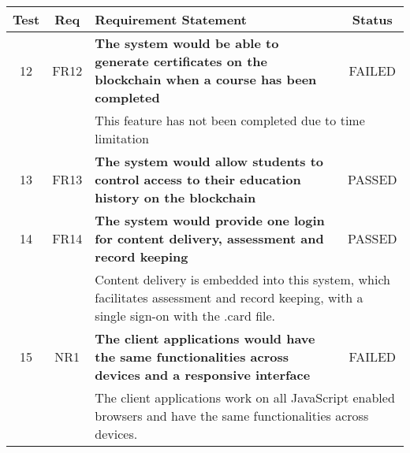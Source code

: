 \begin{table}[!ht]
    \begin{tabularx}{\textwidth}{|c|c|X|c|}
        \hline
		Test                                                              & Req                     & Requirement Statement                                                                                                                                 & Status                  \\
        \hline
        12                                                                & FR12                    & \textbf{The system would be able to generate certificates on
		the blockchain when a course has been completed}                  & \cellcolor{pink}FAILED                                                                                                                                                                                    \\
        \hline
        &                         & \multicolumn{2}{X|}{This feature has not been completed due to time limitation}                                                                                                 \\
        \hline
		13                                                                & FR13                    & \textbf{The system would allow students to control access to
		their education history on the blockchain}                        & \cellcolor{green}PASSED                                                                                                                                                                                   \\
		\hline
		14 & FR14 & \textbf{The system would provide one login for content delivery, assessment and record keeping} & \cellcolor{green}PASSED \\
		\hline
		   &      & \multicolumn{2}{X|}{Content delivery is embedded into this system, which facilitates
			assessment and record keeping, with a single sign-on with the .card file.}                                                            \\
        \hline
        15 & NR1 & \textbf{The client applications would have the same functionalities
        across devices and a responsive interface} & \cellcolor{pink}FAILED \\
		\hline
           &      & \multicolumn{2}{X|}{The client applications work on all 
           JavaScript enabled browsers and have the same functionalities across devices.
}
\end{tabularx}
\end{table}
